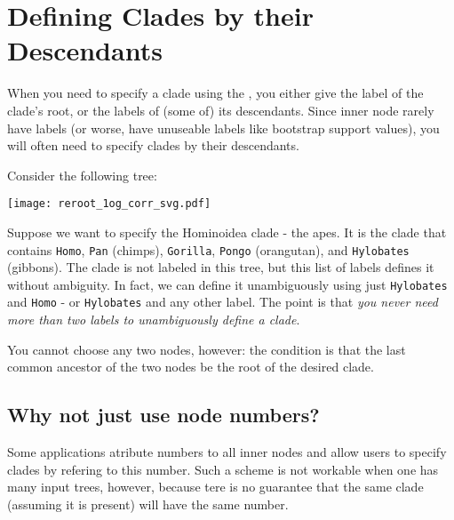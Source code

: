 \chapter{Defining Clades by their Descendants}
\label{sct_def_clades}

When you need to specify a clade using the \nutils{}, you either give the label
of the clade's root, or the labels of (some of) its descendants. Since inner
node rarely have labels (or worse, have unuseable labels like bootstrap support
		values), you will often need to specify clades by their
descendants.

Consider the following tree:

\begin{center}
\texttt{[image: reroot\_1og\_corr\_svg.pdf]} 
\end{center}

Suppose we want to specify the Hominoidea clade - the apes. It is the clade
that contains \texttt{Homo}, \texttt{Pan} (chimps), \texttt{Gorilla},
     \texttt{Pongo} (orangutan), and \texttt{Hylobates} (gibbons). The clade is
     not labeled in this tree, but this list of labels defines it without
     ambiguity. In fact, we can define it unambiguously using just
     \texttt{Hylobates} and \texttt{Homo} - or \texttt{Hylobates} and any other
     label. The point is that \emph{you never need more than two labels to
     unambiguously define a clade}.

You cannot choose any two nodes, however: the condition is that the last
common ancestor of the two nodes be the root of the desired clade.

\section{Why not just use node numbers?}

Some applications atribute numbers to all inner nodes and allow users to specify clades by refering to this number. Such a scheme is not workable when one has many input trees, however, because tere is no guarantee that the same clade (assuming it is present) will have the same number.
